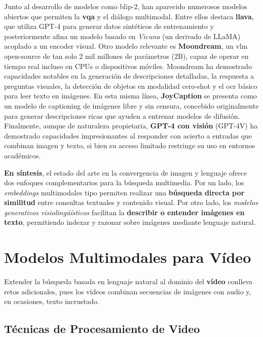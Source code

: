 Junto al desarrollo de modelos como \gls{blip}-2, han aparecido numerosos modelos abiertos que permiten la \textbf{\gls{vqa}} y el diálogo multimodal. Entre ellos destaca \textbf{\gls{llava}}, que utiliza GPT-4 para generar datos sintéticos de entrenamiento y posteriormente afina un modelo basado en \emph{Vicuna} (un derivado de LLaMA) acoplado a un encoder visual. Otro modelo relevante es \textbf{Moondream}, un \gls{vlm} open-source de tan solo 2 mil millones de parámetros (2B), capaz de operar en tiempo real incluso en CPUs o dispositivos móviles. Moondream ha demostrado capacidades notables en la generación de descripciones detalladas, la respuesta a preguntas visuales, la detección de objetos en modalidad cero-shot y el \gls{ocr} básico para leer texto en imágenes. En esta misma línea, \textbf{JoyCaption} se presenta como un modelo de captioning de imágenes libre y sin censura, concebido originalmente para generar descripciones ricas que ayuden a entrenar modelos de difusión. Finalmente, aunque de naturaleza propietaria, \textbf{GPT-4 con visión} (GPT-4V) ha demostrado capacidades impresionantes al responder con acierto a entradas que combinan imagen y texto, si bien su acceso limitado restringe su uso en entornos académicos.

\textbf{En síntesis}, el estado del arte en la convergencia de imagen y lenguaje ofrece dos enfoques complementarios para la búsqueda multimedia. Por un lado, los \emph{embeddings} multimodales tipo  permiten realizar una \textbf{búsqueda directa por similitud} entre consultas textuales y contenido visual. Por otro lado, los \emph{modelos generativos visiolingüísticos} facilitan la \textbf{describir o entender imágenes en texto}, permitiendo indexar y razonar sobre imágenes mediante lenguaje natural.

\section{Modelos Multimodales para Vídeo}

Extender la búsqueda basada en lenguaje natural al dominio del \textbf{vídeo} conlleva retos adicionales, pues los vídeos combinan secuencias de imágenes con audio y, en ocasiones, texto incrustado.

\subsection{Técnicas de Procesamiento de Video}

